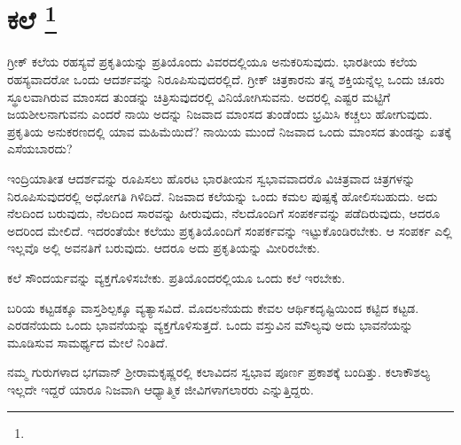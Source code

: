 
\chapter[ಕಲೆ ]{ಕಲೆ \protect\footnote{}}

ಗ್ರೀಕ್​ ಕಲೆಯ ರಹಸ್ಯವೆ ಪ್ರಕೃತಿಯನ್ನು ಪ್ರತಿಯೊಂದು ವಿವರದಲ್ಲಿಯೂ ಅನುಕರಿಸುವುದು. ಭಾರತೀಯ ಕಲೆಯ ರಹಸ್ಯವಾದರೋ ಒಂದು ಆದರ್ಶವನ್ನು ನಿರೂಪಿಸುವುದರಲ್ಲಿದೆ. ಗ್ರೀಕ್​ ಚಿತ್ರಕಾರನು ತನ್ನ ಶಕ್ತಿಯನ್ನೆಲ್ಲ ಒಂದು ಚೂರು ಸ್ಥೂಲವಾಗಿರುವ ಮಾಂಸದ ತುಂಡನ್ನು ಚಿತ್ರಿಸುವುದರಲ್ಲಿ ವಿನಿಯೋಗಿಸುವನು. ಅದರಲ್ಲಿ ಎಷ್ಟರ ಮಟ್ಟಿಗೆ ಜಯಶೀಲನಾಗುವನು ಎಂದರೆ ನಾಯಿ ಅದನ್ನು ನಿಜವಾದ ಮಾಂಸದ ತುಂಡೆಂದು ಭ್ರಮಿಸಿ ಕಚ್ಚಲು ಹೋಗುವುದು. ಪ್ರಕೃತಿಯ ಅನುಕರಣದಲ್ಲಿ ಯಾವ ಮಹಿಮೆಯಿದೆ? ನಾಯಿಯ ಮುಂದೆ ನಿಜವಾದ ಒಂದು ಮಾಂಸದ ತುಂಡನ್ನು ಏತಕ್ಕೆ ಎಸೆಯಬಾರದು?

ಇಂದ್ರಿಯಾತೀತ ಆದರ್ಶವನ್ನು ರೂಪಿಸಲು ಹೊರಟ ಭಾರತೀಯನ ಸ್ವಭಾವವಾದರೊ ವಿಚಿತ್ರವಾದ ಚಿತ್ರಗಳನ್ನು ನಿರೂಪಿಸುವುದರಲ್ಲಿ ಅಧೋಗತಿ ಗಿಳಿದಿದೆ. ನಿಜವಾದ ಕಲೆಯನ್ನು ಒಂದು ಕಮಲ ಪುಷ್ಪಕ್ಕೆ ಹೋಲಿಸಬಹುದು. ಅದು ನೆಲದಿಂದ ಬರುವುದು, ನೆಲದಿಂದ ಸಾರವನ್ನು ಹೀರುವುದು, ನೆಲದೊಂದಿಗೆ ಸಂಪರ್ಕವನ್ನು ಪಡೆದಿರುವುದು, ಆದರೂ ಅದರಿಂದ ಮೇಲಿದೆ. ಇದರಂತೆಯೇ ಕಲೆಯು ಪ್ರಕೃತಿಯೊಂದಿಗೆ ಸಂಪರ್ಕವನ್ನು ಇಟ್ಟುಕೊಂಡಿರಬೇಕು. ಆ ಸಂಪರ್ಕ ಎಲ್ಲಿ ಇಲ್ಲವೊ ಅಲ್ಲಿ ಅವನತಿಗೆ ಬರುವುದು. ಆದರೂ ಅದು ಪ್ರಕೃತಿಯನ್ನು ಮೀರಿರಬೇಕು.

ಕಲೆ ಸೌಂದರ್ಯವನ್ನು ವ್ಯಕ್ತಗೊಳಿಸಬೇಕು. ಪ್ರತಿಯೊಂದರಲ್ಲಿಯೂ ಒಂದು ಕಲೆ ಇರಬೇಕು.

ಬರಿಯ ಕಟ್ಟಡಕ್ಕೂ ವಾಸ್ತಶಿಲ್ಪಕ್ಕೂ ವ್ಯತ್ಯಾಸವಿದೆ. ಮೊದಲನೆಯದು ಕೇವಲ ಆರ್ಥಿಕದೃಷ್ಟಿಯಿಂದ ಕಟ್ಟಿದ ಕಟ್ಟಡ. ಎರಡನೆಯದು ಒಂದು ಭಾವನೆಯನ್ನು ವ್ಯಕ್ತಗೊಳಿಸುತ್ತದೆ. ಒಂದು ವಸ್ತುವಿನ ಮೌಲ್ಯವು ಅದು ಭಾವನೆಯನ್ನು ಮೂಡಿಸುವ ಸಾಮರ್ಥ್ಯದ ಮೇಲೆ ನಿಂತಿದೆ.

ನಮ್ಮ ಗುರುಗಳಾದ ಭಗವಾನ್​ ಶ‍್ರೀರಾಮಕೃಷ್ಣರಲ್ಲಿ ಕಲಾವಿದನ ಸ್ವಭಾವ ಪೂರ್ಣ ಪ್ರಕಾಶಕ್ಕೆ ಬಂದಿತ್ತು. ಕಲಾಕೌಶಲ್ಯ ಇಲ್ಲದೇ ಇದ್ದರೆ ಯಾರೂ ನಿಜವಾಗಿ ಆಧ್ಯಾತ್ಮಿಕ ಜೀವಿಗಳಾಗಲಾರರು ಎನ್ನುತ್ತಿದ್ದರು.

